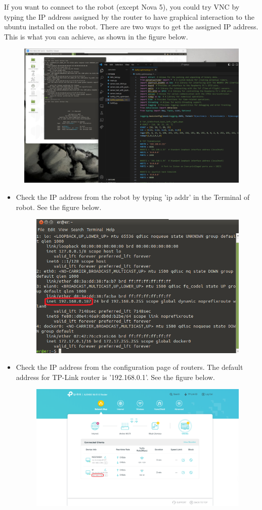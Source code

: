 \documentclass[hidelinks]{article}
\begin{document}
If you want to connect to the robot (except Nova 5), you could try VNC by typing the IP address assigned by the router to have graphical interaction to the ubuntu installed on the robot. There are two ways to get the assigned IP address. This is what you can achieve, as shown in the figure below.

\begin{figure}[H]
    \centering
    \includegraphics[width=0.75\linewidth]{Figures/work_flow.png}
\end{figure}

\begin{itemize}
    \item Check the IP address from the robot by typing 'ip addr' in the Terminal of robot. See the figure below.
\begin{figure}[H]
    \centering
    \includegraphics[width=0.6\linewidth]{Figures/ip_robot.png}
\end{figure}
    \item Check the IP address from the configuration page of routers. The default address for TP-Link router is '192.168.0.1'. See the figure below.
\begin{figure}[H]
    \centering
    \includegraphics[width=0.75\linewidth]{Figures/ip_router.png}
\end{figure}
\end{itemize}
\end{document}
